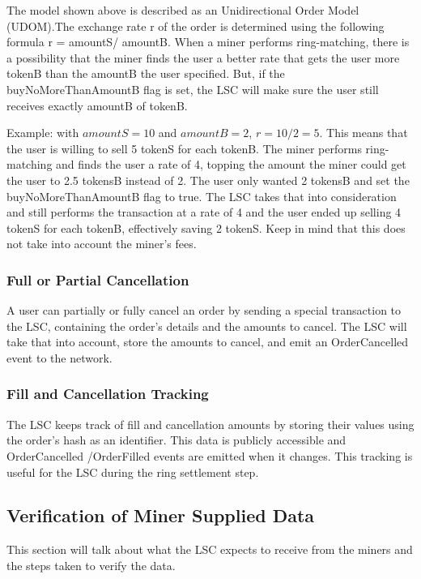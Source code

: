\documentclass[UTF8,nofonts]{article}
\begin{document}
The model shown above is described as an Unidirectional Order Model (UDOM).The exchange rate r of the order is determined using the following formula r = amountS/ amountB. When a miner performs ring-matching, there is a possibility that the miner finds the user a better rate that gets the user more tokenB than the amountB the user specified. But, if the buyNoMoreThanAmountB flag is set, the LSC will make sure the user still receives exactly amountB of tokenB.

Example: with $amountS = 10$ and $amountB = 2$, $r = 10/2 = 5$. This means that the user is willing to sell 5 tokenS for each tokenB. The miner performs ring-matching and finds the user a rate of 4, topping the amount the miner could get the user to 2.5 tokensB instead of 2. The user only wanted 2 tokensB and set the buyNoMoreThanAmountB flag to true. The LSC takes that into consideration and still performs the transaction at a rate of 4 and the user ended up selling 4 tokenS for each tokenB, effectively saving 2 tokenS. Keep in mind that this does not take into account the miner’s fees.

\subsubsection{Full or Partial Cancellation}
A user can partially or fully cancel an order by sending a special transaction to the LSC, containing the order’s details and the amounts to cancel. The LSC will take that into account, store the amounts to cancel, and emit an OrderCancelled event to the network.

\subsubsection{Fill and Cancellation Tracking}
The LSC keeps track of fill and cancellation amounts by storing their values using the order's hash as an identifier. This data is publicly accessible and OrderCancelled /OrderFilled events are emitted when it changes.
This tracking is useful for the LSC during the ring settlement step.

\subsection{Verification of Miner Supplied Data}

This section will talk about what the LSC expects to receive from the miners and the steps taken to verify the data.
\end{document}
